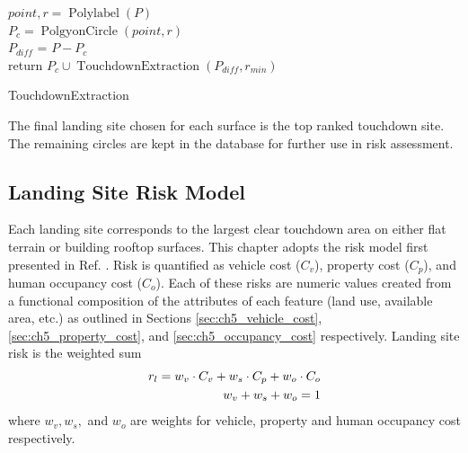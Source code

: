 \begin{algorithm}
    \SetStartEndCondition{ }{}{}%

    
    $point, r = \operatorname{Polylabel}(P)$ \\
    $P_{c} = \operatorname{PolgyonCircle}(point, r)$ \\
    $P_{diff}$ = $P - P_{c}$ \\
    return $P_{c} \cup \operatorname{TouchdownExtraction}(P_{diff}, r_{min})$
    \caption[Touchdown Point Extraction]{TouchdownExtraction}
    \label{alg:ch5_touchdown_extraction}
\end{algorithm}

The final landing site chosen for each surface is the top ranked touchdown site. The remaining circles are kept in the database for further use in risk assessment.

\subsection{Landing Site Risk Model}\label{sec:ch5_risk_model}

Each landing site corresponds to the largest clear touchdown area on either flat terrain or building rooftop surfaces. This chapter adopts the risk model first presented in Ref. \cite{castagno_comprehensive_2018}.  Risk is quantified as vehicle cost ($C_v$), property cost ($C_p$), and human occupancy cost ($C_o$). Each of these risks are numeric values created from a functional composition of the attributes of each feature (land use, available area, etc.) as outlined in Sections \ref{sec:ch5_vehicle_cost}, \ref{sec:ch5_property_cost}, and \ref{sec:ch5_occupancy_cost} respectively. Landing site risk is the weighted sum
\begin{align}\label{eq:ch5_landing_site_risk}
    r_l = w_v \cdot C_v + w_s \cdot C_p + w_o \cdot C_o \\
    w_v + w_s + w_o = 1 \notag
\end{align}
where $w_v, w_s,$ and $w_o$ are weights for vehicle, property and human occupancy cost respectively.

